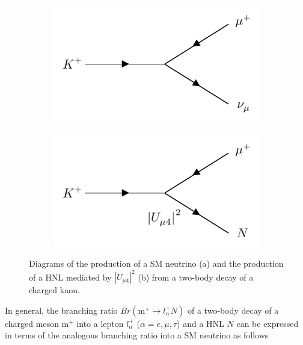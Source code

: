 \begin{figure}[htbp!]
\begin{subfigure}[h]{0.4\linewidth}
\centering    
\includegraphics[width=\linewidth]{K_to_nu}
\caption{}
\end{subfigure}
\hfill
\begin{subfigure}[h]{0.4\linewidth}
\centering    
\includegraphics[width=\linewidth]{K_to_HNL}
\caption{}
\end{subfigure}%
\caption[kaonDiagram]{
Diagrams of the production of a SM neutrino (a) and the production of a HNL mediated by $|U_{\mu4}|^{2}$ (b) from a two-body decay of a charged kaon.
}\label{fig:kaonDiagram}
\end{figure}

In general, the branching ratio $Br(\text{m}^{+}\rightarrow l^{+}_{\alpha}N)$ of a two-body decay of a charged meson $\text{m}^{+}$ into a lepton $l^{+}_{\alpha}$ ($\alpha=e,\mu,\tau$) and a HNL $N$ can be expressed in terms of the analogous branching ratio into a SM neutrino as follows \cite{HNLKelly}

